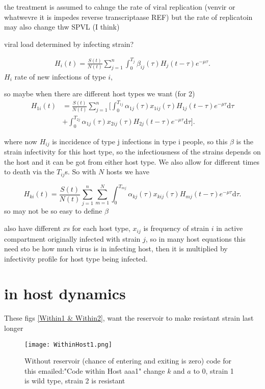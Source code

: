 \documentclass[twocolumn]{svjour3}          %
\begin{document}
the treatment is assumed to cahnge the rate of viral replication (venvir or whatwevre it is impedes reverse transcriptaase  REF)
but the rate of replicatoin may also  change thw SPVL (I think)
\cite{Williamson2015}

viral load determined by infecting strain?

\begin{gather*}
H_i(t) = \frac{S(t)}{N(t)}  \sum_{j=1}^n  \int_0^{T_j} \beta_{ij}(\tau) H_j(t-\tau)e^{-\mu \tau}.
\end{gather*}
$H_i$  rate of new infections of type $i$, 

so maybe when there are different host types we want (for 2)
\begin{align*}
H_{1i}(t) &= \frac{S(t)}{N(t)}  \sum_{j=1}^n  \bigg[ \int_0^{T_{1j}} \alpha_{1j}(\tau) x_{1ij}(\tau) H_{1j}(t-\tau)e^{-\mu \tau} \text{d}\tau  \\
&+  \int_0^{T_{2j}} 
\alpha_{1j}(\tau) x_{2ij}(\tau) H_{2j}(t-\tau)e^{-\mu \tau} \text{d}\tau  \bigg] .
\end{align*}

where now $H_{ij}$ is inccidence of type j infections in type i people, so this $\beta $ is the strain infectivity for this host type, so the infectiousness of the strains depends on the host and it can be got from either host type. We also  allow for different 
times to death via the $T_{ij}$s. So with $N$ hosts  we have 

\begin{equation*}
H_{ki}(t) = \frac{S(t)}{N(t)}  \sum_{j=1}^n \sum_{m=1}^N  \int_0^{T_{mj}} \alpha_{k j}(\tau) x_{kij}(\tau) H_{mj}(t-\tau)e^{-\mu \tau} \text{d}\tau.
\end{equation*}
so may not be so easy to define $\beta$

also have different $x$s for each host type, $x_{ij}$ is frequency of strain $i$ in active compartment originally infected with strain $j$, so in many host equations this need sto be how much virus is in infecting host, then it is multiplied by infectivity profile for host type being infected.

\section{in host dynamics}


These figs \ref{Within1 & Within2}, want the reservoir to make resistant strain last longer 


\begin{figure*}
  \texttt{[image: WithinHost1.png]}
\caption{Without reservoir (chance of entering and exiting is zero)  code for this emailed:"Code within Host aaa1" change $k$ and $a$ to $0$, strain 1 is wild type, strain 2 is resistant  }
\label{Within1}       %
\end{figure*}
\end{document}
